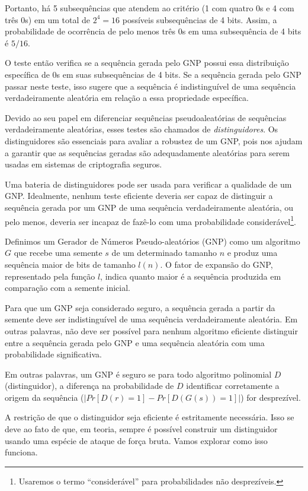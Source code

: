 Portanto, há 5 subsequências que atendem ao critério (1 com quatro $0$s e 4 com três $0$s) em um total de $2^4 = 16$ possíveis subsequências de 4 bits.
Assim, a probabilidade de ocorrência de pelo menos três $0$s em uma subsequência de 4 bits é $5/16$.

O teste então verifica se a sequência gerada pelo GNP possui essa distribuição específica de $0$s em suas subsequências de 4 bits.
Se a sequência gerada pelo GNP passar neste teste, isso sugere que a sequência é indistinguível de uma sequência verdadeiramente aleatória em relação a essa propriedade específica.

Devido ao seu papel em diferenciar sequências pseudoaleatórias de sequências verdadeiramente aleatórias, esses testes são chamados de {\em distinguidores}.
Os distinguidores são essenciais para avaliar a robustez de um GNP, pois nos ajudam a garantir que as sequências geradas são adequadamente aleatórias para serem usadas em sistemas de criptografia seguros.

Uma bateria de distinguidores pode ser usada para verificar a qualidade de um GNP.
Idealmente, nenhum teste eficiente deveria ser capaz de distinguir a sequência gerada por um GNP de uma sequência verdadeiramente aleatória, ou pelo menos, deveria ser incapaz de fazê-lo com uma probabilidade considerável\footnote{Usaremos o termo ``considerável'' para probabilidades não desprezíveis.}.

Definimos um Gerador de Números Pseudo-aleatórios (GNP) como um algoritmo $G$ que recebe uma semente $s$ de um determinado tamanho $n$ e produz uma sequência maior de bits de tamanho $l(n)$.
O fator de expansão do GNP, representado pela função $l$, indica quanto maior é a sequência produzida em comparação com a semente inicial.

Para que um GNP seja considerado seguro, a sequência gerada a partir da semente deve ser indistinguível de uma sequência verdadeiramente aleatória.
Em outras palavras, não deve ser possível para nenhum algoritmo eficiente distinguir entre a sequência gerada pelo GNP e uma sequência aleatória com uma probabilidade significativa.

Em outras palavras, um GNP é seguro se para todo algoritmo polinomial $D$ (distinguidor), a diferença na probabilidade de $D$ identificar corretamente a origem da sequência ($|Pr[D(r) = 1] - Pr[D(G(s)) = 1]|$) for desprezível.

A restrição de que o distinguidor seja eficiente é estritamente necessária.
Isso se deve ao fato de que, em teoria, sempre é possível construir um distinguidor usando uma espécie de ataque de força bruta.
Vamos explorar como isso funciona.


